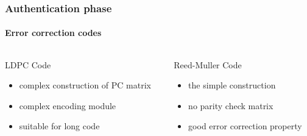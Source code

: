 \documentclass{beamer}
\begin{document}
\begin{frame}
	\frametitle{Authentication phase}
	\framesubtitle{Error correction codes}
	\begin{columns}
		\begin{column}{0.52\textwidth}
			LDPC Code\\
			\begin{itemize}
				\item complex construction of PC matrix\\
			\end{itemize}
			\begin{itemize}
				\item complex encoding module\\
			\end{itemize}
			\begin{itemize}
				\item suitable for long code
			\end{itemize}		
		\end{column}
		\begin{column}{0.48\textwidth}
			Reed-Muller Code\\
			\begin{itemize}
				\item the simple construction\\
			\end{itemize}
			\begin{itemize}
			\item no parity check matrix\\
			\end{itemize}
			\begin{itemize}
				\item good error correction property
			\end{itemize}			
		\end{column}
	\end{columns}
\end{frame}
\end{document}
